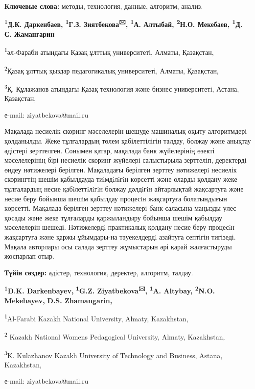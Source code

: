 {\bfseries Ключевые слова:} методы, технология, данные, алгоритм, анализ.


\begin{center}
{\bfseries \textsuperscript{1}Д.К. Даркенбаев, \textsuperscript{1}Г.З.
Зиятбекова\textsuperscript{🖂}, \textsuperscript{1}А. Алтыбай,
\textsuperscript{2}Н.О. Мекебаев, \textsuperscript{1}Д. С. Жамангарин}

\textsuperscript{1}әл-Фараби атындағы Қазақ ұлттық университеті, Алматы,
Қазақстан,

\textsuperscript{2}Қазақ ұлттық қыздар педагогикалық университеті,
Алматы, Қазақстан,

\textsuperscript{3}Қ. Құлажанов атындағы Қазақ технология және бизнес
университеті, Астана, Қазақстан,

е-mail: ziyatbekova@mail.ru
\end{center}


Мақалада несиелік скоринг мәселелерін шешуде машиналық оқыту
алгоритмдері қолданылды. Жеке тұлғалардың төлем қабілеттілігін талдау,
болжау және анықтау әдістері зерттелген. Сонымен қатар, мақалада банк
жүйелерінің өзекті мәселелерінің бірі несиелік скоринг жүйелері
салыстырыла зерттеліп, деректерді өңдеу нәтижелері берілген. Мақаладағы
берілген зерттеу нәтижелерi несиелік скорингтің шешім қабылдауда
тиiмдiлiгiн көрсетті және оларды қолдану жеке тұлғалардың несие
қабiлеттiлiгiн болжау дәлдiгiн айтарлықтай жақсартуға және несие беру
бойынша шешiм қабылдау процесiн жақсартуға болатындығын көрсетті.
Мақалада берілген зерттеу нәтижелері банк саласына маңызды үлес қосады
және жеке тұлғаларды қаржыландыру бойынша шешім қабылдау мәселелерін
шешеді. Нәтижелердi практикалық қолдану несие беру процесiн жақсартуға
және қаржы ұйымдары-на тәуекелдердi азайтуға септігін тигізеді. Мақала
авторлары осы салада зерттеу жұмыстарын әрі қарай жалғастыруды жоспарлап
отыр.

{\bfseries Түйін сөздер:} әдістер, технология, деректер, алгоритм, талдау.


\begin{center}
{\bfseries \textsuperscript{1}D.K. Darkenbayev,}
{\bfseries \textsuperscript{1}G.Z. Ziyatbekova\textsuperscript{🖂},}
{\bfseries \textsuperscript{1}A. Altybay, \textsuperscript{2}N.O.
Mekebayev,} {\bfseries D.S. Zhamangarin,}

\textsuperscript{1}Al-Farabi Kazakh National University, Almaty,
Kazakhstan,

\textsuperscript{2} Kazakh National Women\textquotesingle s Pedagogical
University, Almaty, Kazakhstan,

\textsuperscript{3}K. Kulazhanov Kazakh University of Technology and
Business, Astana, Kazakhstan,

е-mail: ziyatbekova@mail.ru
\end{center}


